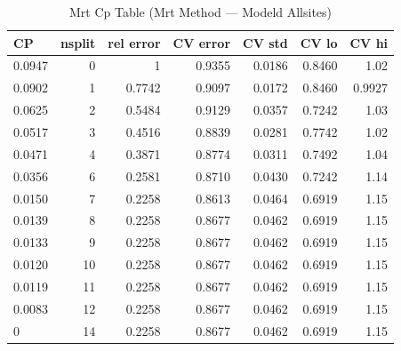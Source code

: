\begin{table}[htbp]
  \centering
  \caption{Mrt Cp Table (Mrt Method — Modeld Allsites)}
  \label{tab:MRT_Method_ModelD_AllSites_tables_mrt_cp_table}
  \small
  \begin{tabular}{lrrrrrr}
    \toprule
    CP & nsplit & rel error & CV error & CV std & CV lo & CV hi \\
    \midrule
    0.0947 & 0 & 1 & 0.9355 & 0.0186 & 0.8460 & 1.02 \\
    0.0902 & 1 & 0.7742 & 0.9097 & 0.0172 & 0.8460 & 0.9927 \\
    0.0625 & 2 & 0.5484 & 0.9129 & 0.0357 & 0.7242 & 1.03 \\
    0.0517 & 3 & 0.4516 & 0.8839 & 0.0281 & 0.7742 & 1.02 \\
    0.0471 & 4 & 0.3871 & 0.8774 & 0.0311 & 0.7492 & 1.04 \\
    0.0356 & 6 & 0.2581 & 0.8710 & 0.0430 & 0.7242 & 1.14 \\
    0.0150 & 7 & 0.2258 & 0.8613 & 0.0464 & 0.6919 & 1.15 \\
    0.0139 & 8 & 0.2258 & 0.8677 & 0.0462 & 0.6919 & 1.15 \\
    0.0133 & 9 & 0.2258 & 0.8677 & 0.0462 & 0.6919 & 1.15 \\
    0.0120 & 10 & 0.2258 & 0.8677 & 0.0462 & 0.6919 & 1.15 \\
    0.0119 & 11 & 0.2258 & 0.8677 & 0.0462 & 0.6919 & 1.15 \\
    0.0083 & 12 & 0.2258 & 0.8677 & 0.0462 & 0.6919 & 1.15 \\
    0 & 14 & 0.2258 & 0.8677 & 0.0462 & 0.6919 & 1.15 \\
    \bottomrule
  \end{tabular}
\end{table}
